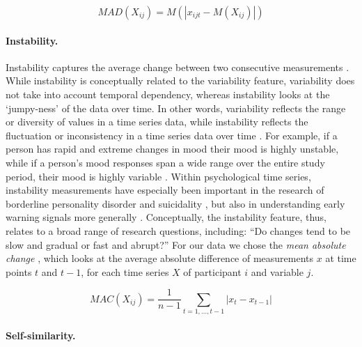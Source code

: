 \begin{equation} \label{eq:mad}
  MAD(X_{ij}) = M(\left| x_{ijt} - M(X_{ij}) \right|)
\end{equation}

\paragraph{Instability.}

Instability captures the average change between two consecutive
measurements \citep{ebner-priemer2009}. While instability is
conceptually related to the variability feature, variability does not
take into account temporal dependency, whereas instability looks at the
`jumpy-ness' of the data over time. In other words, variability reflects
the range or diversity of values in a time series data, while
instability reflects the fluctuation or inconsistency in a time series
data over time \citep{trull2008}. For example, if a person has rapid and
extreme changes in mood their mood is highly unstable, while if a
person's mood responses span a wide range over the entire study period,
their mood is highly variable \citep{jahng2008}. Within psychological
time series, instability measurements have especially been important in
the research of borderline personality disorder \citep{trull2008} and
suicidality \citep{kivela2022}, but also in understanding early warning
signals more generally \citep{wichers2019}. Conceptually, the
instability feature, thus, relates to a broad range of research
questions, including: ``Do changes tend to be slow and gradual or fast
and abrupt?'' For our data we chose the \textit{mean absolute change}
\citep[$MAC$; e.g.,][]{ebner-priemer2009, barandas2020}, which looks at
the average absolute difference of measurements \(x\) at time points
\(t\) and \(t-1\), for each time series \(X\) of participant \(i\) and
variable \(j\).

\begin{equation} \label{eq:mac}
  MAC(X_{ij}) = \frac{1}{n-1} \sum_{t=1, \ldots, t-1}\left|x_{t}-x_{t-1}\right|
\end{equation}

\paragraph{Self-similarity.}

